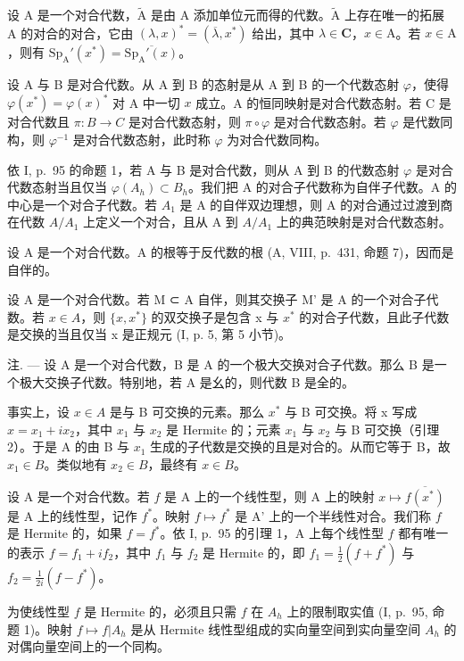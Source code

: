 设 A 是一个对合代数，\(\widetilde{\mathrm{A}}\) 是由 A 添加单位元而得的代数。\(\widetilde{\mathrm{A}}\) 上存在唯一的拓展 A 的对合的对合，它由 \((\lambda, x)^{*} = (\overline{\lambda}, x^{*})\) 给出，其中 \(\lambda \in \mathbf{C}\)，\(x \in \mathrm{A}\)。若 \(x \in \mathrm{A}\)，则有 \(\mathrm{Sp}_{\mathrm{A}}'(x^{*}) = \overline{\mathrm{Sp}_{\mathrm{A}}'(x)}\)。

设 A 与 B 是对合代数。从 A 到 B 的态射是从 A 到 B 的一个代数态射 \(\varphi\)，使得 \(\varphi(x^{*}) = \varphi(x)^{*}\) 对 A 中一切 \(x\) 成立。A 的恒同映射是对合代数态射。若 C 是对合代数且 \(\pi: B \to C\) 是对合代数态射，则 \(\pi \circ \varphi\) 是对合代数态射。若 \(\varphi\) 是代数同构，则 \(\varphi^{-1}\) 是对合代数态射，此时称 \(\varphi\) 为对合代数同构。

依 I, p.~95 的命题 1，若 A 与 B 是对合代数，则从 A 到 B 的代数态射 \(\varphi\) 是对合代数态射当且仅当 \(\varphi(A_h) \subset B_h\)。我们把 A 的对合子代数称为自伴子代数。A 的中心是一个对合子代数。若 \(A_1\) 是 A 的自伴双边理想，则 A 的对合通过过渡到商在代数 \(A/A_1\) 上定义一个对合，且从 A 到 \(A/A_1\) 上的典范映射是对合代数态射。

设 A 是一个对合代数。A 的根等于反代数的根 (A, VIII, p.~431, 命题 7)，因而是自伴的。

设 A 是一个对合代数。若 M ⊂ A 自伴，则其交换子 M' 是 A 的一个对合子代数。若 \(x \in A\)，则 \(\{x, x^{*}\}\) 的双交换子是包含 x 与 \(x^{*}\) 的对合子代数，且此子代数是交换的当且仅当 x 是正规元 (I, p. 5, 第 5 小节)。

注. — 设 A 是一个对合代数，B 是 A 的一个极大交换对合子代数。那么 B 是一个极大交换子代数。特别地，若 A 是幺的，则代数 B 是全的。

事实上，设 \(x \in A\) 是与 B 可交换的元素。那么 \(x^{*}\) 与 B 可交换。将 x 写成 \(x = x_{1} + ix_{2}\)，其中 \(x_{1}\) 与 \(x_{2}\) 是 Hermite 的；元素 \(x_{1}\) 与 \(x_{2}\) 与 B 可交换（引理 2）。于是 A 的由 B 与 \(x_{1}\) 生成的子代数是交换的且是对合的。从而它等于 B，故 \(x_{1} \in B\)。类似地有 \(x_{2} \in B\)，最终有 \(x \in B\)。

设 A 是一个对合代数。若 \(f\) 是 A 上的一个线性型，则 A 上的映射 \(x \mapsto \overline{f(x^*)}\) 是 A 上的线性型，记作 \(f^*\)。映射 \(f \mapsto f^*\) 是 A' 上的一个半线性对合。我们称 \(f\) 是 Hermite 的，如果 \(f = f^*\)。依 I, p.~95 的引理 1，A 上每个线性型 \(f\) 都有唯一的表示 \(f = f_1 + if_2\)，其中 \(f_1\) 与 \(f_2\) 是 Hermite 的，即 \(f_1 = \frac{1}{2}(f + f^*)\) 与 \(f_2 = \frac{1}{2i}(f - f^*)\)。

为使线性型 \(f\) 是 Hermite 的，必须且只需 \(f\) 在 \(A_h\) 上的限制取实值 (I, p.~95, 命题 1)。映射 \(f \mapsto f|A_h\) 是从 Hermite 线性型组成的实向量空间到实向量空间 \(A_h\) 的对偶向量空间上的一个同构。

